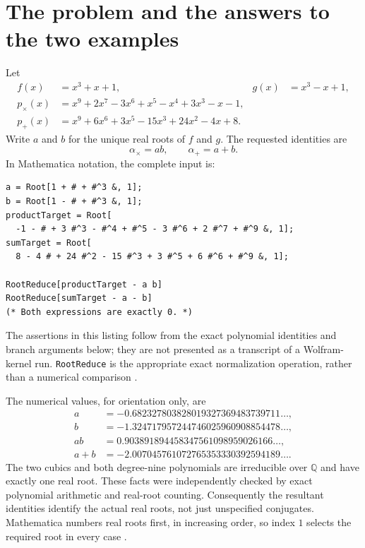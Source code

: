 \documentclass[11pt,a4paper]{article}
\theoremstyle{definition}\newtheorem{definition}[theorem]{Definition}
\theoremstyle{remark}\newtheorem{remark}[theorem]{Remark}
\newcommand{\Q}{\mathbb{Q}}\newcommand{\C}{\mathbb{C}}
\newcommand{\code}[1]{\texttt{#1}}
\begin{document}
\section{The problem and the answers to the two examples}
\label{sec:examples}
Let
\begin{align}
f(x)&=x^3+x+1, & g(x)&=x^3-x+1,\\
p_{\times}(x)&=x^9+2x^7-3x^6+x^5-x^4+3x^3-x-1,\label{eq:pm}\\
p_{+}(x)&=x^9+6x^6+3x^5-15x^3+24x^2-4x+8.\label{eq:pa}
\end{align}
Write $a$ and $b$ for the unique real roots of $f$ and $g$. The requested identities are
\begin{equation}
\boxed{\alpha_{\times}=ab,\qquad \alpha_+=a+b.}
\end{equation}
In Mathematica notation, the complete input is:
\begin{lstlisting}
a = Root[1 + # + #^3 &, 1];
b = Root[1 - # + #^3 &, 1];
productTarget = Root[
  -1 - # + 3 #^3 - #^4 + #^5 - 3 #^6 + 2 #^7 + #^9 &, 1];
sumTarget = Root[
  8 - 4 # + 24 #^2 - 15 #^3 + 3 #^5 + 6 #^6 + #^9 &, 1];

RootReduce[productTarget - a b]
RootReduce[sumTarget - a - b]
(* Both expressions are exactly 0. *)
\end{lstlisting}
The assertions in this listing follow from the exact polynomial identities and branch arguments below; they are not presented as a transcript of a Wolfram-kernel run. \code{RootReduce} is the appropriate exact normalization operation, rather than a numerical comparison \cite{rootreduce}.

The numerical values, for orientation only, are
\begin{align*}
a&=-0.682327803828019327369483739711\ldots,\\
b&=-1.324717957244746025960908854478\ldots,\\
ab&=0.903891894458347561098959026166\ldots,\\
a+b&=-2.007045761072765353330392594189\ldots.
\end{align*}
The two cubics and both degree-nine polynomials are irreducible over $\Q$ and have exactly one real root. These facts were independently checked by exact polynomial arithmetic and real-root counting. Consequently the resultant identities identify the actual real roots, not just unspecified conjugates. Mathematica numbers real roots first, in increasing order, so index $1$ selects the required root in every case \cite{root}.
\end{document}
